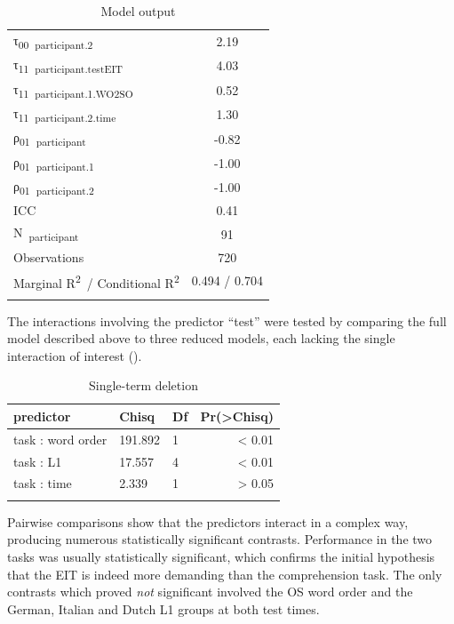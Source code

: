 \begin{table}
\begin{tabularx}{\textwidth}{Xrrr}
    τ\textsubscript{00}~\textsubscript{participant.2} & \multicolumn{3}{c}{2.19}\\
    τ\textsubscript{11}~\textsubscript{participant.testEIT} & \multicolumn{3}{c}{4.03}\\
    τ\textsubscript{11}~\textsubscript{participant.1.WO2SO} & \multicolumn{3}{c}{0.52}\\
    τ\textsubscript{11}~\textsubscript{participant.2.time} & \multicolumn{3}{c}{1.30}\\
    ρ\textsubscript{01}~\textsubscript{participant} & \multicolumn{3}{c}{{}-0.82}\\
    ρ\textsubscript{01}~\textsubscript{participant.1} & \multicolumn{3}{c}{{}-1.00}\\
    ρ\textsubscript{01}~\textsubscript{participant.2} & \multicolumn{3}{c}{{}-1.00}\\
    ICC & \multicolumn{3}{c}{0.41}\\
    N~\textsubscript{participant} & \multicolumn{3}{c}{91}\\
    Observations & \multicolumn{3}{c}{720}\\
    Marginal R\textsuperscript{2}~/ Conditional R\textsuperscript{2} & \multicolumn{3}{c}{0.494 / 0.704}\\
    \lspbottomrule
    \end{tabularx}
    \caption{Model output}
    \label{tab:06:7}
\end{table}

The interactions involving the predictor “test” were tested by comparing the full model described above to three reduced models, each lacking the single interaction of interest ().

\begin{table}
    \begin{tabularx}{\textwidth}{XXXr}
    \lsptoprule
    predictor & Chisq & Df & Pr(>Chisq)\\
    \midrule
    task : word order & 191.892 & 1 & < 0.01\\
    task : L1 & 17.557 & 4 & < 0.01\\
    task : time & 2.339 & 1 & > 0.05\\
    \lspbottomrule
    \end{tabularx}
    \caption{Single-term deletion}
    \label{tab:06:8}
\end{table}

Pairwise comparisons show that the predictors interact in a complex way, producing numerous statistically significant contrasts. Performance in the two tasks was usually statistically significant, which confirms the initial hypothesis that the EIT is indeed more demanding than the comprehension task. The only contrasts which proved \textit{not} significant involved the OS word order and the German, Italian and Dutch L1 groups at both test times.

